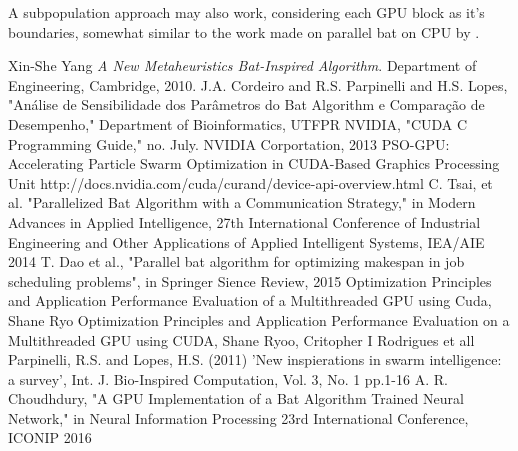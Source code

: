 \documentclass[conference]{IEEEtran}
\begin{document}
A subpopulation approach may also work, considering each GPU block as
it's boundaries, somewhat similar to the work made on parallel bat on
CPU by \cite{paralellCPU}.

\begin{thebibliography}{1}
    Xin-She Yang \emph{A New Metaheuristics Bat-Inspired Algorithm}. Department of Engineering, Cambridge, 2010.
    J.A. Cordeiro and R.S. Parpinelli and H.S. Lopes, "Análise de Sensibilidade dos Parâmetros do Bat Algorithm e Comparação de Desempenho," Department of Bioinformatics, UTFPR
    NVIDIA, "CUDA C Programming Guide," no. July. NVIDIA Corportation, 2013
    PSO-GPU: Accelerating Particle Swarm Optimization in CUDA-Based Graphics Processing Unit
    http://docs.nvidia.com/cuda/curand/device-api-overview.html
    C. Tsai, et al. "Parallelized Bat Algorithm with a Communication Strategy," in Modern Advances in Applied Intelligence, 27th International Conference of Industrial Engineering and Other Applications of Applied Intelligent Systems, IEA/AIE 2014
    T. Dao et al.,  "Parallel bat algorithm for optimizing makespan in job scheduling problems", in Springer Sience Review, 2015
    Optimization Principles and Application Performance Evaluation of a Multithreaded GPU using Cuda, Shane Ryo
    Optimization Principles and Application Performance Evaluation on a Multithreaded GPU using CUDA, Shane Ryoo, Critopher I Rodrigues et all
    Parpinelli, R.S. and Lopes, H.S. (2011) 'New inspierations in swarm intelligence: a survey', Int. J. Bio-Inspired Computation, Vol. 3, No. 1 pp.1-16
    A. R. Choudhdury, "A GPU Implementation of a Bat Algorithm Trained Neural Network," in Neural Information Processing 23rd International Conference, ICONIP 2016
\end{thebibliography}
\end{document}
